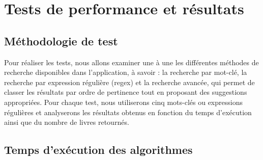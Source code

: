 \documentclass{article}
\begin{document}
\section{Tests de performance et résultats}
    \subsection{Méthodologie de test}
    Pour réaliser les tests, nous allons examiner une à une les différentes méthodes de recherche disponibles dans l’application, à savoir : la recherche par mot-clé, la recherche par expression régulière (regex) et la recherche avancée, qui permet de classer les résultats par ordre de pertinence tout en proposant des suggestions appropriées.
    Pour chaque test, nous utiliserons cinq mots-clés ou expressions régulières et analyserons les résultats obtenus en fonction du temps d’exécution ainsi que du nombre de livres retournés.

    \subsection{Temps d’exécution des algorithmes}
\end{document}

